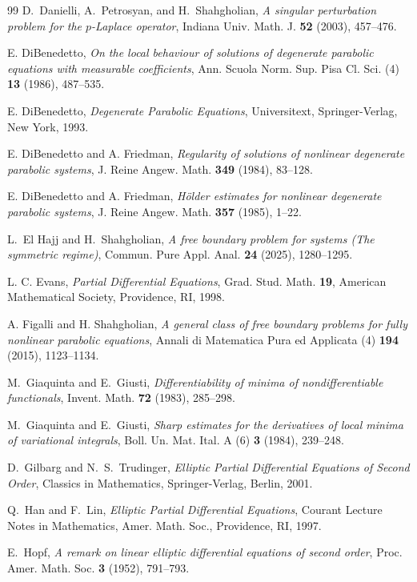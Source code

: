 \documentclass[11pt,oneside,english]{amsart}
\numberwithin{equation}{section}
\theoremstyle{plain}
\numberwithin{equation}{section}
\begin{document}
\begin{thebibliography}{99}
D.~Danielli, A.~Petrosyan, and H.~Shahgholian,
\emph{A singular perturbation problem for the $p$-Laplace operator},
Indiana Univ. Math. J. \textbf{52} (2003), 457--476.

E. DiBenedetto,
\emph{On the local behaviour of solutions of degenerate parabolic equations with measurable coefficients},
Ann. Scuola Norm. Sup. Pisa Cl. Sci. (4) \textbf{13} (1986), 487--535.

E. DiBenedetto,
\emph{Degenerate Parabolic Equations},
Universitext, Springer-Verlag, New York, 1993.

E. DiBenedetto and A. Friedman,
\emph{Regularity of solutions of nonlinear degenerate parabolic systems},
J. Reine Angew. Math. \textbf{349} (1984), 83--128.

E. DiBenedetto and A. Friedman,
\emph{H\"{o}lder estimates for nonlinear degenerate parabolic systems},
J. Reine Angew. Math. \textbf{357} (1985), 1--22.

L.~El Hajj and H.~Shahgholian,
\emph{A free boundary problem for systems (The symmetric regime)},
Commun. Pure Appl. Anal. \textbf{24} (2025), 1280--1295.

L. C. Evans,
\emph{Partial Differential Equations},
Grad. Stud. Math. \textbf{19}, American Mathematical Society, Providence, RI, 1998.

A. Figalli and H. Shahgholian,
\emph{A general class of free boundary problems for fully nonlinear parabolic equations},
Annali di Matematica Pura ed Applicata (4) \textbf{194} (2015), 1123--1134.

M.~Giaquinta and E.~Giusti,
\emph{Differentiability of minima of nondifferentiable functionals},
Invent. Math. \textbf{72} (1983), 285--298.

M.~Giaquinta and E.~Giusti,
\emph{Sharp estimates for the derivatives of local minima of variational integrals},
Boll. Un. Mat. Ital. A (6) \textbf{3} (1984), 239--248.

D.~Gilbarg and N.~S.~Trudinger,
\emph{Elliptic Partial Differential Equations of Second Order},
Classics in Mathematics, Springer-Verlag, Berlin, 2001.

Q.~Han and F.~Lin,
\emph{Elliptic Partial Differential Equations},
Courant Lecture Notes in Mathematics, Amer. Math. Soc., Providence, RI, 1997.

E.~Hopf,
\emph{A remark on linear elliptic differential equations of second order},
Proc. Amer. Math. Soc. \textbf{3} (1952), 791--793.


\end{thebibliography}
\end{document}
